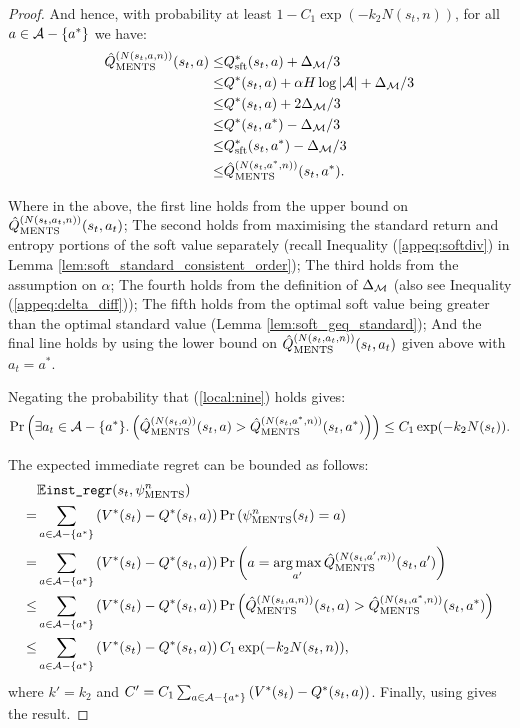 \begin{proof}
        And hence, with probability at least $1-C_1 \exp(-k_2N(s_t,n))$, for all $a\in\mathcal{A}-\{a^*\}$ we have:
        \begin{align}
            {\hat{Q}^{(N(s_t,a,n))}_{{\textnormal{MENTS}}}}(s_t,a)
                \leq& Q_{{\textnormal{sft}}}^*(s_t,a) + \Delta_{\mathcal{M}}/3 \\
                \leq& Q^*(s_t,a) + \alpha H\log |\mathcal{A}| + \Delta_{\mathcal{M}}/3 \\
                \leq& Q^*(s_t,a) + 2\Delta_{\mathcal{M}}/3 \\
                \leq& Q^*(s_t,a^*) - \Delta_{\mathcal{M}}/3 \\
                \leq& Q_{{\textnormal{sft}}}^*(s_t,a^*) - \Delta_{\mathcal{M}}/3 \\
                \leq& {\hat{Q}^{(N(s_t,a^*,n))}_{{\textnormal{MENTS}}}}(s_t,a^*). \label{local:nine}
        \end{align}
        
        Where in the above, the first line holds from the upper bound on ${\hat{Q}^{(N(s_t,a_t,n))}_{{\textnormal{MENTS}}}}(s_t,a_t)$; The second holds from maximising the standard return and entropy portions of the soft value separately (recall Inequality (\ref{appeq:softdiv}) in Lemma \ref{lem:soft_standard_consistent_order}); The third holds from the assumption on $\alpha$; The fourth holds from the definition of $\Delta_{\mathcal{M}}$ (also see Inequality (\ref{appeq:delta_diff})); The fifth holds from the optimal soft value being greater than the optimal standard value (Lemma \ref{lem:soft_geq_standard}); And the final line holds by using the lower bound on ${\hat{Q}^{(N(s_t,a_t,n))}_{{\textnormal{MENTS}}}}(s_t,a_t)$ given above with $a_t=a^*$. 
        
        Negating the probability that (\ref{local:nine}) holds gives:
        \begin{align}
            \Pr\left(\exists a_t\in\mathcal{A}-\{a^*\}.\left( 
                {\hat{Q}^{(N(s_t,a))}_{{\textnormal{MENTS}}}}(s_t,a) > {\hat{Q}^{(N(s_t,a^*,n))}_{{\textnormal{MENTS}}}}(s_t,a^*)\right)\right)
                \leq C_1 \exp(-k_2N(s_t)).
        \end{align}
        
        The expected immediate regret can be bounded as follows:
        \begin{align}
            & \mathbb{E}{\textnormal{\texttt{inst\_regr}}}(s_t,\psi^{n}_{{\textnormal{MENTS}}})  \\
                =& \sum_{a\in\mathcal{A}-\{a^*\}} 
                    \left(V^*(s_t)-Q^*(s_t,a)\right) \Pr\left(\psi^{n}_{{\textnormal{MENTS}}}(s_t) =a \right) \\
                =& \sum_{a\in\mathcal{A}-\{a^*\}} 
                    \left(V^*(s_t)-Q^*(s_t,a)\right) \Pr\left(a = \operatorname*{arg\,max}_{a'} {\hat{Q}^{(N(s_t,a',n))}_{{\textnormal{MENTS}}}}(s_t,a') \right) \\
                \leq& \sum_{a\in\mathcal{A}-\{a^*\}} 
                    \left(V^*(s_t)-Q^*(s_t,a)\right) \Pr\left({\hat{Q}^{(N(s_t,a,n))}_{{\textnormal{MENTS}}}}(s_t,a) > {\hat{Q}^{(N(s_t,a^*,n))}_{{\textnormal{MENTS}}}}(s_t,a^*)  \right) \\
                \leq&  \sum_{a\in\mathcal{A}-\{a^*\}} 
                    \left(V^*(s_t)-Q^*(s_t,a)\right) C_1 \exp(-k_2N(s_t,n)),
        \end{align}
        where $k'=k_2$ and $C'=C_1\sum_{a\in\mathcal{A}-\{a^*\}} \left(V^*(s_t)-Q^*(s_t,a)\right)$. Finally, using  gives the result.
    \end{proof}

